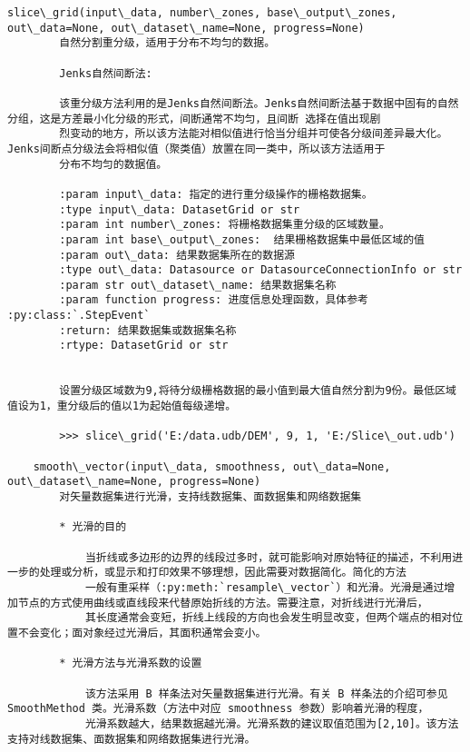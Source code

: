 \documentclass[11pt]{article}
\begin{document}
\begin{Verbatim}[commandchars=\\\{\}]
    slice\_grid(input\_data, number\_zones, base\_output\_zones, out\_data=None, out\_dataset\_name=None, progress=None)
        自然分割重分级，适用于分布不均匀的数据。
        
        Jenks自然间断法:
        
        该重分级方法利用的是Jenks自然间断法。Jenks自然间断法基于数据中固有的自然分组，这是方差最小化分级的形式，间断通常不均匀，且间断 选择在值出现剧
        烈变动的地方，所以该方法能对相似值进行恰当分组并可使各分级间差异最大化。Jenks间断点分级法会将相似值（聚类值）放置在同一类中，所以该方法适用于
        分布不均匀的数据值。
        
        :param input\_data: 指定的进行重分级操作的栅格数据集。
        :type input\_data: DatasetGrid or str
        :param int number\_zones: 将栅格数据集重分级的区域数量。
        :param int base\_output\_zones:  结果栅格数据集中最低区域的值
        :param out\_data: 结果数据集所在的数据源
        :type out\_data: Datasource or DatasourceConnectionInfo or str
        :param str out\_dataset\_name: 结果数据集名称
        :param function progress: 进度信息处理函数，具体参考 :py:class:`.StepEvent`
        :return: 结果数据集或数据集名称
        :rtype: DatasetGrid or str
        
        
        设置分级区域数为9,将待分级栅格数据的最小值到最大值自然分割为9份。最低区域值设为1，重分级后的值以1为起始值每级递增。
        
        >>> slice\_grid('E:/data.udb/DEM', 9, 1, 'E:/Slice\_out.udb')
    
    smooth\_vector(input\_data, smoothness, out\_data=None, out\_dataset\_name=None, progress=None)
        对矢量数据集进行光滑，支持线数据集、面数据集和网络数据集
        
        * 光滑的目的
        
            当折线或多边形的边界的线段过多时，就可能影响对原始特征的描述，不利用进一步的处理或分析，或显示和打印效果不够理想，因此需要对数据简化。简化的方法
            一般有重采样（:py:meth:`resample\_vector`）和光滑。光滑是通过增加节点的方式使用曲线或直线段来代替原始折线的方法。需要注意，对折线进行光滑后，
            其长度通常会变短，折线上线段的方向也会发生明显改变，但两个端点的相对位置不会变化；面对象经过光滑后，其面积通常会变小。
        
        * 光滑方法与光滑系数的设置
        
            该方法采用 B 样条法对矢量数据集进行光滑。有关 B 样条法的介绍可参见 SmoothMethod 类。光滑系数（方法中对应 smoothness 参数）影响着光滑的程度，
            光滑系数越大，结果数据越光滑。光滑系数的建议取值范围为[2,10]。该方法支持对线数据集、面数据集和网络数据集进行光滑。
        

\end{Verbatim}
\end{document}
